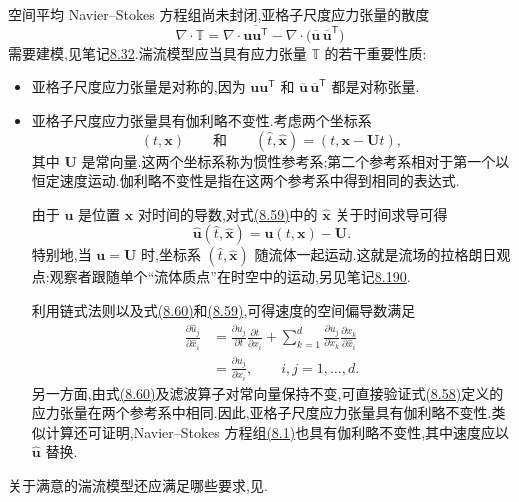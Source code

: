 \begin{note}[亚格子尺度应力张量的若干性质]
\label{note:sgs-stress-properties}
空间平均 Navier--Stokes 方程组尚未封闭,亚格子尺度应力张量的散度
\begin{equation}\label{eq:sgs-stress-divergence}
 \nabla\cdot\mathbb{T}
  =\nabla\cdot\overline{\bm{u}\bm{u}^{\mathsf T}}
   -\nabla\cdot\bigl(
      \overline{\bm{u}}\,
      \overline{\bm{u}}^{\mathsf T}
    \bigr)
\end{equation}
需要建模,见笔记\hyperref[note:les-closure-problem]{8.32}.湍流模型应当具有应力张量 $\mathbb{T}$ 的若干重要性质:
\begin{itemize}
 \item 亚格子尺度应力张量是对称的,因为 $\bm{u}\bm{u}^{\mathsf T}$ 和 $\overline{\bm{u}}\,\overline{\bm{u}}^{\mathsf T}$ 都是对称张量.
 \item 亚格子尺度应力张量具有伽利略不变性.考虑两个坐标系
 \begin{equation}\label{eq:galilean-coordinate-transform}
  (t,\bm{x})
  \qquad\text{和}\qquad
  (\hat t,\hat{\bm{x}})
  =(t,\bm{x}-\bm{U}t),
 \end{equation}
 其中 $\bm{U}$ 是常向量.这两个坐标系称为惯性参考系;第二个参考系相对于第一个以恒定速度运动.伽利略不变性是指在这两个参考系中得到相同的表达式.

  由于 $\bm{u}$ 是位置 $\bm{x}$ 对时间的导数,对式\hyperref[eq:galilean-coordinate-transform]{(8.59)}中的 $\hat{\bm{x}}$ 关于时间求导可得
 \begin{equation}\label{eq:galilean-velocity-transform}
  \hat{\bm{u}}(\hat t,\hat{\bm{x}})
   =\bm{u}(t,\bm{x})-\bm{U}.
 \end{equation}
  特别地,当 $\bm{u}=\bm{U}$ 时,坐标系 $(\hat t,\hat{\bm{x}})$ 随流体一起运动.这就是流场的拉格朗日观点:观察者跟随单个“流体质点”在时空中的运动,另见笔记\hyperref[note:lagrangian-description-flow]{8.190}.

  利用链式法则以及式\hyperref[eq:galilean-velocity-transform]{(8.60)}和\hyperref[eq:galilean-coordinate-transform]{(8.59)},可得速度的空间偏导数满足
  \[
  \begin{aligned}
   \frac{\partial\hat u_j}{\partial\hat x_i}
    &=\frac{\partial u_j}{\partial t}
       \frac{\partial t}{\partial\hat x_i}
      +\sum_{k=1}^{d}
       \frac{\partial u_j}{\partial x_k}
       \frac{\partial x_k}{\partial\hat x_i}\\
    &=\frac{\partial u_j}{\partial x_i},
       \qquad i,j=1,\ldots,d.
  \end{aligned}
  \]
 另一方面,由式\hyperref[eq:galilean-velocity-transform]{(8.60)}及滤波算子对常向量保持不变,可直接验证式\hyperref[eq:sgs-stress-divergence]{(8.58)}定义的应力张量在两个参考系中相同.因此,亚格子尺度应力张量具有伽利略不变性.类似计算还可证明,Navier--Stokes 方程组\hyperref[eq:turbulent-navier-stokes]{(8.1)}也具有伽利略不变性,其中速度应以 $\hat{\bm{u}}$ 替换.
 \end{itemize}
 关于满意的湍流模型还应满足哪些要求,见\textcite[第 6.2 节]{BerselliIliescuLayton2006}.
\end{note}

